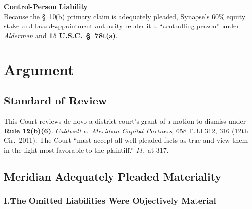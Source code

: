\documentclass[12pt]{article}
\newcommand{\courtcase}[1]{\textit{#1}}
\newcommand{\statute}[1]{\textbf{#1}}
\begin{document}
\noindent\begin{minipage}[t]{0.48\textwidth}
\begin{tcolorbox}[authoritybox]
  \begin{center}
  \end{center}
  \vspace{4pt}
  {\small\color{NavyDeep}\bfseries Control-Person Liability}\\[4pt]
  {\small\color{SlateGrey}
  Because the \S\ 10(b) primary claim is adequately pleaded, Synapse's 60\% equity
  stake and board-appointment authority render it a ``controlling person'' under
  \textit{Alderman} and \statute{15 U.S.C.\ \S\ 78t(a)}.}
\end{tcolorbox}
\end{minipage}

\vspace{18pt}


\section{Argument}

\subsection{Standard of Review}

This Court reviews de novo a district court's grant of a motion to dismiss under
\statute{Rule 12(b)(6)}. \courtcase{Caldwell v.\ Meridian Capital Partners}, 658 F.3d
312, 316 (12th Cir.\ 2011). The Court ``must accept all well-pleaded facts as true
and view them in the light most favorable to the plaintiff.'' \textit{Id.}\ at 317.

\subsection{Meridian Adequately Pleaded Materiality}

\subsubsection{I.\quad The Omitted Liabilities Were Objectively Material}
\end{document}
